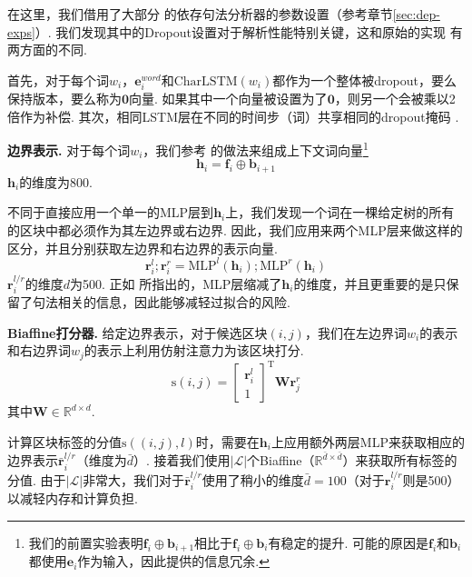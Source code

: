 在这里，我们借用了大部分 \citet{dozat-etal-2017-biaffine}的依存句法分析器的参数设置（参考章节\ref{sec:dep-exps}）.
我们发现其中的Dropout设置对于解析性能特别关键，这和原始的实现 \citep{stern-etal-2017-minimal}有两方面的不同.

首先，对于每个词$w_i$，$\mathbf{e}^{word}_i$和$\mathrm{CharLSTM}(w_i)$都作为一个整体被dropout，要么保持版本，要么称为$\mathbf{0}$向量.
如果其中一个向量被设置为了$\mathbf{0}$，则另一个会被乘以2倍作为补偿.
其次，相同LSTM层在不同的时间步（词）共享相同的dropout掩码 \citep{yarin-etal-2016-dropout}.

\noindent\textbf{边界表示.}
对于每个词$w_i$，我们参考 \citet{stern-etal-2017-minimal}的做法来组成上下文词向量\footnote{我们的前置实验表明$\mathbf{f}_i \oplus \mathbf{b}_{i+1}$相比于$\mathbf{f}_i \oplus \mathbf{b}_i$有稳定的提升.
  可能的原因是$\mathbf{f}_i$和$\mathbf{b}_i$都使用$\mathbf{e}_i$作为输入，因此提供的信息冗余.}
\begin{equation}
  \mathbf{h}_i = \mathbf{f}_i \oplus \mathbf{b}_{i+1}
\end{equation}
$\mathbf{h}_i$的维度为800.

不同于直接应用一个单一的MLP层到$\mathbf{h}_i$上，我们发现一个词在一棵给定树的所有的区块中都必须作为其左边界或右边界.
因此，我们应用来两个MLP层来做这样的区分，并且分别获取左边界和右边界的表示向量.
\begin{equation}
  \label{mlp-boundaries}
  \mathbf{r}_i^{l}; \mathbf{r}_i^{r} =\mathrm{MLP}^{l} \left( \mathbf{h}_i \right); \mathrm{MLP}^{r} \left( \mathbf{h}_i \right)
\end{equation}
$\mathbf{r}_i^{l/r}$的维度$d$为500.
正如 \citet{dozat-etal-2017-biaffine}所指出的，MLP层缩减了$\mathbf{h}_i$的维度，并且更重要的是只保留了句法相关的信息，因此能够减轻过拟合的风险.

\noindent\textbf{Biaffine打分器.}
给定边界表示，对于候选区块$(i,j)$，我们在左边界词$w_i$的表示和右边界词$w_j$的表示上利用仿射注意力为该区块打分.
\begin{equation} \label{eq:con-biaffine}
  \mathrm{s}(i,j) =  \left[
    \begin{array}{c}
      \mathbf{r}_{i}^{l} \\
      1
    \end{array}
    \right]^\mathrm{T}
  \mathbf{W} \mathbf{r}_{j}^{r}
\end{equation}
其中$\mathbf{W} \in \mathbb{R}^{d \times d}$.

计算区块标签的分值$\mathrm{s}((i,j),l)$时，需要在$\mathbf{h}_i$上应用额外两层MLP来获取相应的边界表示$\bar{\mathbf{r}}^{l/r}_i$（维度为$\bar{d}$）.
接着我们使用$|\mathcal{L}|$个Biaffine（$\mathbb{R}^{\bar{d} \times \bar{d}}$）来获取所有标签的分值.
由于$|\mathcal{L}|$非常大，我们对于$\bar{\mathbf{r}}^{l/r}_i$使用了稍小的维度$\bar{d}=100$（对于${\mathbf{r}}^{l/r}_i$则是500）以减轻内存和计算负担.

